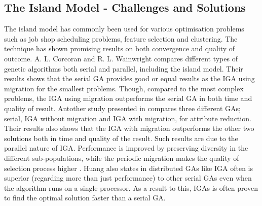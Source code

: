\subsection{The Island Model - Challenges and Solutions}
\label{sec:motivation:iga}
The island model has commonly been used for various optimisation problems such as job shop scheduling problems, feature selection and clustering. The technique has shown promising results on both convergence and quality of outcome. A. L. Corcoran and R. L. Wainwright \cite{IGA:Corcoran} compares different types of genetic algorithms both serial and parallel, including the island model. Their results shows that the serial GA provides good or equal results as the IGA using migration for the smallest problems. Though, compared to the most complex problems, the IGA using migration outperforms the serial GA in both time and quality of result. Antother study presented in \cite{IGA:attribute-reduction} compares three different GAs; serial, IGA without migration and IGA with migration, for attribute reduction. Their results also shows that the IGA with migration outperforms the other two solutions both in time and quality of the result. Such results are due to the parallel nature of IGA. Performance is improved by preserving diversity in the different sub-populations, while the periodic migration makes the quality of selection process  higher \cite{IGA:DGA-optimization-of-wind-farm}. Huang also states in \cite{IGA:DGA-optimization-of-wind-farm} distributed GAs like IGA often is superior (regarding more than just performance) to other serial GAs even when the algorithm runs on a single processor. As a result to this, IGAs is often proven to find the optimal solution faster than a serial GA.

